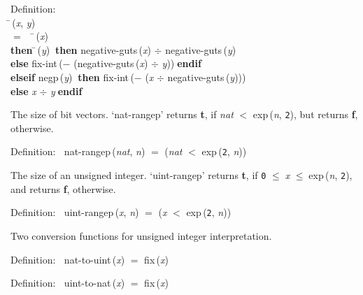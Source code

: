 \begin{tabbing}{\sc Definition}: \\  
\=\,({\it{x\/}}, {\it{y\/}}) \\ 
$=$$\;\;\;\;$\=\,({\it{x\/}}) \\ 
{\bf then }\=\,({\it{y\/}})$\;\;${\bf then }{\rm{negative-guts}}\,({\it{x\/}}) $\div$ {\rm{negative-guts}}\,({\it{y\/}}) \\ 
{\bf else }{\rm{fix-int}}\,($-$ ({\rm{negative-guts}}\,({\it{x\/}}) $\div$ {\it{y\/}}))$\;${\bf  endif}\- \\ 
{\bf elseif }{\rm{negp}}\,({\it{y\/}})$\;\;${\bf then }{\rm{fix-int}}\,($-$ ({\it{x\/}} $\div$ {\rm{negative-guts}}\,({\it{y\/}}))) \\ 
{\bf else }{\it{x\/}} $\div$ {\it{y\/}}$\;${\bf  endif}\-\-
\end{tabbing}

 The size of bit vectors.
 `nat-rangep' returns {\bf{t}}, if {\it{nat\/}} $<$ {\rm{exp}}\,({\it{n\/}}, {\tt{2}}), but returns {\bf{f}}, otherwise.
\begin{tabbing}{\sc Definition}:$\;\;$
{\rm{nat-rangep}}\,({\it{nat\/}}, {\it{n\/}}) $=$ ({\it{nat\/}} $<$ {\rm{exp}}\,({\tt{2}}, {\it{n\/}}))
\end{tabbing}

 The size of an unsigned integer.
 `uint-rangep' returns {\bf{t}}, if {\tt{0}} $\leq$$\;${\it{x\/}} $\leq$$\;${\rm{exp}}\,({\it{n\/}}, {\tt{2}}), and returns {\bf{f}}, otherwise.
\begin{tabbing}{\sc Definition}:$\;\;$
{\rm{uint-rangep}}\,({\it{x\/}}, {\it{n\/}}) $=$ ({\it{x\/}} $<$ {\rm{exp}}\,({\tt{2}}, {\it{n\/}}))
\end{tabbing}

 Two conversion functions for unsigned integer interpretation.
\begin{tabbing}{\sc Definition}:$\;\;$
{\rm{nat-to-uint}}\,({\it{x\/}}) $=$ {\rm{fix}}\,({\it{x\/}})
\end{tabbing}

\begin{tabbing}{\sc Definition}:$\;\;$
{\rm{uint-to-nat}}\,({\it{x\/}}) $=$ {\rm{fix}}\,({\it{x\/}})
\end{tabbing}

